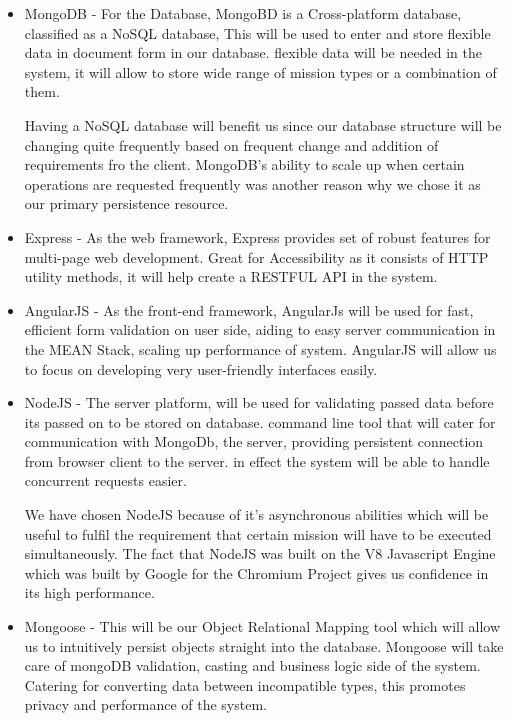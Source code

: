 \documentclass{article}
\begin{document}
	 \begin{itemize}
	 	
	 	
	 	
	 	\item MongoDB - For the Database, MongoBD is a Cross-platform database, classified as a NoSQL database, This will be used to enter and store flexible data in document form in our database. flexible data will be needed in the system, it will allow to store wide range of mission types or a combination of them.
	 	
	 	Having a NoSQL database will benefit us since our database structure will be changing quite frequently based on frequent change and addition of requirements fro the client. MongoDB's ability to scale up when certain operations are requested frequently was another reason why we chose it as our primary persistence resource.
		
	 	\item Express - As the web framework, Express provides set of robust features for multi-page web development. Great for Accessibility as it consists of HTTP utility methods, it will help create a RESTFUL API in the system.
	 	
	 	
	 	\item AngularJS - As the front-end framework, AngularJs will be used for fast, efficient form validation on user side, aiding to easy server communication in the MEAN Stack, scaling up performance of system. AngularJS will allow us to focus on developing very user-friendly interfaces easily.
	 	
	 	\item NodeJS - The server platform, will be used for validating passed data before its passed on to be stored on database. command line  tool that will cater for  communication with MongoDb, the server, providing persistent connection from browser client to the server. in effect the system will be able to handle concurrent requests easier.
	 	
		We have chosen NodeJS because of it's asynchronous abilities which will be useful to fulfil the requirement that certain mission will have to be executed simultaneously. The fact that NodeJS was built on the V8 Javascript Engine which was built by Google for the Chromium Project gives us confidence in its high performance.
		
	 	\item Mongoose - This will be our Object Relational Mapping tool which will allow us to intuitively persist objects straight into the database. Mongoose will take care of mongoDB validation, casting and business logic side of the system. Catering for converting data between incompatible types, this promotes privacy and performance of the system.  
	 	

\end{itemize}
\end{document}
